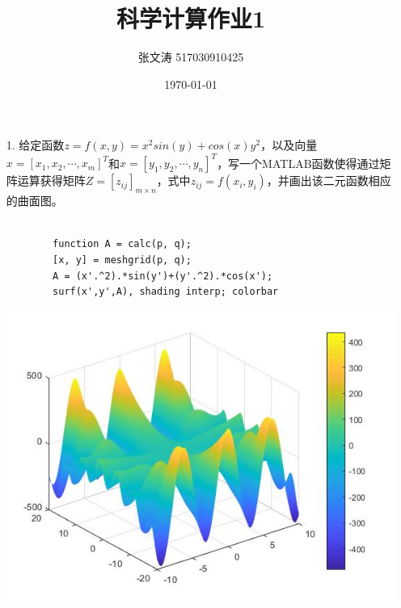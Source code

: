 \documentclass{article}
\title{科学计算作业1}
\author{张文涛 517030910425}
\date{\today}
\begin{document}
	\begin{itemize}
		\item[1.]给定函数$z = f(x, y) = x^{2}sin(y) + cos(x)y^{2}$，以及向量$x =[x_{1}, x_{2}, \cdots, x_{m}]^{T}$和$x =[y_{1}, y_{2}, \cdots, y_{n}]^{T}$，写一个MATLAB函数使得通过矩阵运算获得矩阵$Z = [z_{ij}]_{m\times n}$，式中$z_{ij} = f(x_{i}, y_{i})$，并画出该二元函数相应的曲面图。\\\\
		\begin{lstlisting}
		function A = calc(p, q);
		[x, y] = meshgrid(p, q);
		A = (x'.^2).*sin(y')+(y'.^2).*cos(x');
		surf(x',y',A), shading interp; colorbar
		\end{lstlisting}
		\includegraphics[scale=0.8]{HW1-GAI.jpg}
	\end{itemize}
\end{document}
